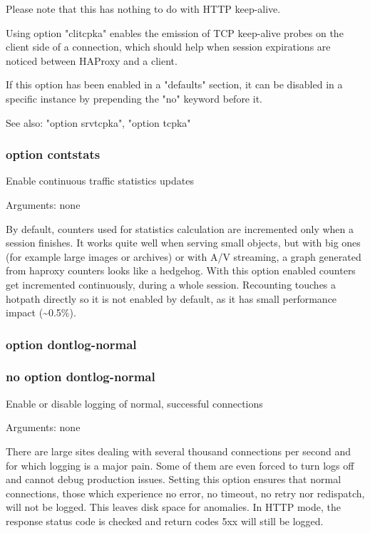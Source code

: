   Please note that this has nothing to do with HTTP keep-alive.

  Using option "clitcpka" enables the emission of TCP keep-alive probes on the
  client side of a connection, which should help when session expirations are
  noticed between HAProxy and a client.

  If this option has been enabled in a "defaults" section, it can be disabled
  in a specific instance by prepending the "no" keyword before it.

  See also: "option srvtcpka", "option tcpka"

\subsubsection{option contstats}


  Enable continuous traffic statistics updates


  Arguments: none

  By default, counters used for statistics calculation are incremented
  only when a session finishes. It works quite well when serving small
  objects, but with big ones (for example large images or archives) or
  with A/V streaming, a graph generated from haproxy counters looks like
  a hedgehog. With this option enabled counters get incremented continuously,
  during a whole session. Recounting touches a hotpath directly so
  it is not enabled by default, as it has small performance impact (\~{}0.5\%).

\subsubsection{option dontlog-normal}
\subsubsection{no option dontlog-normal}


  Enable or disable logging of normal, successful connections


  Arguments: none

  There are large sites dealing with several thousand connections per second
  and for which logging is a major pain. Some of them are even forced to turn
  logs off and cannot debug production issues. Setting this option ensures that
  normal connections, those which experience no error, no timeout, no retry nor
  redispatch, will not be logged. This leaves disk space for anomalies. In HTTP
  mode, the response status code is checked and return codes 5xx will still be
  logged.

